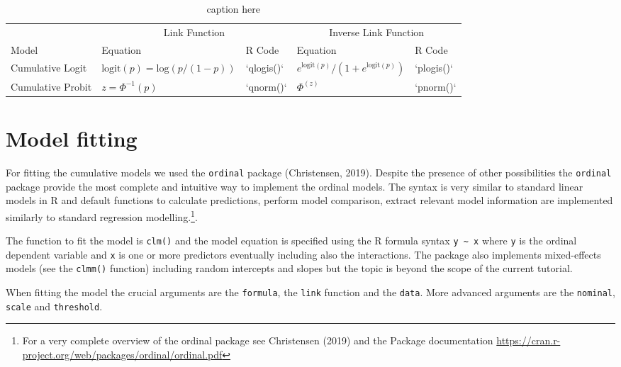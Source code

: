 \documentclass[
  man,floatsintext]{apa6}
\begin{document}
\scriptsize

\begin{table}

\caption{\label{tab:tab-model-summary}caption here}
\centering
\begin{tabular}[t]{lllll}
\toprule
\multicolumn{1}{c}{} & \multicolumn{2}{c}{Link Function} & \multicolumn{2}{c}{Inverse Link Function} \\
\cmidrule(l{3pt}r{3pt}){2-3} \cmidrule(l{3pt}r{3pt}){4-5}
Model & Equation & R Code & Equation & R Code\\
\midrule
Cumulative Logit & $\text{logit}(p) = \text{log}(p / (1-p))$ & `qlogis()` & $e^{\text{logit}(p)} / (1 + e^{\text{logit}(p)})$ & `plogis()`\\
Cumulative Probit & $z = \Phi^{-1}(p)$ & `qnorm()` & $\Phi^(z)$ & `pnorm()`\\
\bottomrule
\end{tabular}
\end{table}

\normalsize

\section{Model fitting}\label{model-fitting}

For fitting the cumulative models we used the \texttt{ordinal} package (Christensen, 2019). Despite the presence of other possibilities the \texttt{ordinal} package provide the most complete and intuitive way to implement the ordinal models. The syntax is very similar to standard linear models in R and default functions to calculate predictions, perform model comparison, extract relevant model information are implemented similarly to standard regression modelling.\footnote{For a very complete overview of the ordinal package see Christensen (2019) and the Package documentation \url{https://cran.r-project.org/web/packages/ordinal/ordinal.pdf}}.

The function to fit the model is \texttt{clm()} and the model equation is specified using the R formula syntax \texttt{y\ \textasciitilde{}\ x} where \texttt{y} is the ordinal dependent variable and \texttt{x} is one or more predictors eventually including also the interactions. The package also implements mixed-effects models (see the \texttt{clmm()} function) including random intercepts and slopes but the topic is beyond the scope of the current tutorial.

When fitting the model the crucial arguments are the \texttt{formula}, the \texttt{link} function and the \texttt{data}. More advanced arguments are the \texttt{nominal}, \texttt{scale} and \texttt{threshold}.
\end{document}

